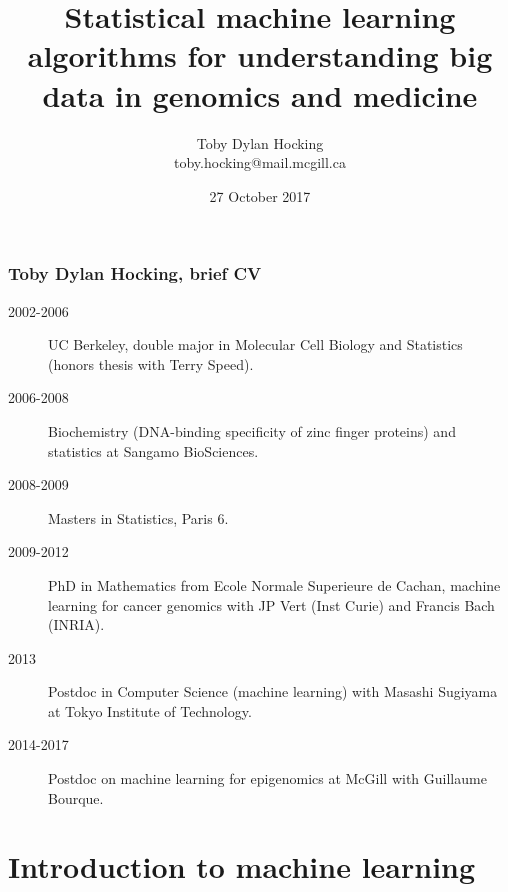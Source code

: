 \documentclass{beamer}
\begin{document}
\title{Statistical machine 
learning algorithms for 
understanding big data in
  genomics and medicine}
\date{27 October 2017}
\author{
  Toby Dylan Hocking\\
  toby.hocking@mail.mcgill.ca
}

\maketitle

\begin{frame}
  \frametitle{Toby Dylan Hocking, brief CV}
  \begin{description}
  \item[2002-2006] UC Berkeley, double major in Molecular Cell Biology
    and Statistics (honors thesis with Terry Speed).
  \item[2006-2008] Biochemistry (DNA-binding specificity of zinc
    finger proteins) and statistics at Sangamo BioSciences.
  \item[2008-2009] Masters in Statistics, Paris 6.
  \item[2009-2012] PhD in Mathematics from Ecole Normale Superieure de
    Cachan, machine learning for cancer genomics with JP Vert (Inst Curie)
    and Francis Bach (INRIA).
  \item[2013] Postdoc in Computer Science (machine learning) with Masashi Sugiyama at Tokyo
    Institute of Technology.
  \item[2014-2017] Postdoc on machine learning for epigenomics
    at McGill with Guillaume Bourque.
  \end{description}
\end{frame}

\section{Introduction to machine learning}
\end{document}

